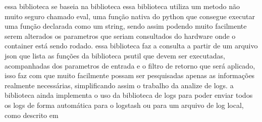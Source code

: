 \documentclass[
	12pt,				%
	openright,			%
	oneside,			%
	a4paper,			%
	english,			%
	french,				%
	spanish,			%
	brazil,				%
	]{abntex2}
\begin{document}
essa biblioteca se baseia na biblioteca  essa biblioteca utiliza um metodo não muito seguro chamado eval,
uma função nativa do python que consegue executar uma função declarada como um string,
sendo assim podendo muito facilmente serem alterados os parametros que seriam consultados do hardware onde o container está sendo rodado.
essa biblioteca faz a consulta a partir de um arquivo json que lista as funções da biblioteca psutil que devem ser executadas,
acompanhadas dos parametros de entrada e o filtro de retorno que será aplicado,
isso faz com que muito facilmente possam ser pesquisadas apenas as informações realmente necessárias,
simplificando assim o trabalho da analize de logs.
a biblioteca ainda implementa o uso da biblioteca de logs para poder enviar todos os logs de forma automática para o logstash ou para um arquivo de log local,
como descrito em 
\end{document}
